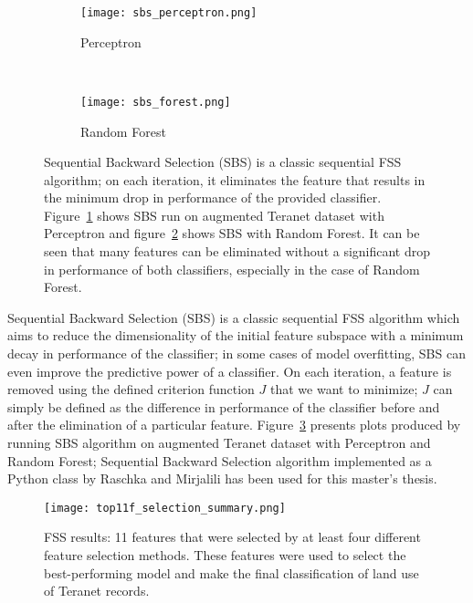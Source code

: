 \begin{figure}[hbt!]
    \centering
    \begin{subfigure}[t]{.45\textwidth}
        \centering
        \texttt{[image: sbs\_perceptron.png]}
        \caption{Perceptron}
        \label{fig:sbs_perceptron}
    \end{subfigure}
    ~ %
    \begin{subfigure}[t]{.53\textwidth}
        \centering
        \texttt{[image: sbs\_forest.png]}
        \caption{Random Forest}
        \label{fig:sbs_forest}
    \end{subfigure}
    \caption{Sequential Backward Selection (SBS) is a classic sequential FSS algorithm;
    on each iteration, it eliminates the feature that results in the minimum drop in performance of the provided classifier.
    Figure~\ref{fig:sbs_perceptron} shows SBS run on augmented Teranet dataset with Perceptron and figure~\ref{fig:sbs_forest} shows SBS with Random Forest.
    It can be seen that many features can be eliminated without a significant drop in performance of both classifiers, especially in the case of Random Forest.}
    \label{fig:sbs_teranet}
\end{figure}

Sequential Backward Selection (SBS) is a classic sequential FSS algorithm which aims to reduce the dimensionality of the initial feature subspace with a minimum decay in performance of the classifier;
in some cases of model overfitting, SBS can even improve the predictive power of a classifier.
On each iteration, a feature is removed using the defined criterion function $J$ that we want to minimize;
$J$ can simply be defined as the difference in performance of the classifier before and after the elimination of a particular feature.
Figure~\ref{fig:sbs_teranet} presents plots produced by running SBS algorithm on augmented Teranet dataset with Perceptron and Random Forest;
Sequential Backward Selection algorithm implemented as a Python class by Raschka and Mirjalili\cite{RaschkaMirjalili2017} has been used for this master's thesis.

\begin{figure}[hbt!]
    \centering
    \texttt{[image: top11f\_selection\_summary.png]}
    \caption{FSS results: 11 features that were selected by at least four different feature selection methods.
    These features were used to select the best-performing model and make the final classification of land use of Teranet records.}
    \label{fig:top_feats}
\end{figure}

